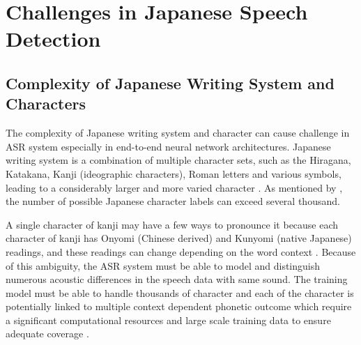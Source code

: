 \section{Challenges in Japanese Speech Detection}
\subsection{Complexity of Japanese Writing System and Characters}
The complexity of Japanese writing system and character can cause challenge in ASR system especially in end-to-end neural network architectures. Japanese writing system is a combination of multiple character sets, such as the Hiragana, Katakana, Kanji (ideographic characters), Roman letters and various symbols, leading to a considerably larger and more varied character \parencite{rose2019unique}. As mentioned by \textcite{Ito2016End-to-end,ito2017}, the number of possible Japanese character labels can exceed several thousand.

A single character of kanji may have a few ways to pronounce it because each character of kanji has Onyomi (Chinese derived) and Kunyomi (native Japanese) readings, and these readings can change depending on the word context \parencite{curtin2020japanese}. Because of this ambiguity, the ASR system must be able to model and distinguish numerous acoustic differences in the speech data with same sound. The training model must be able to handle thousands of character and each of the character is potentially linked to multiple context dependent phonetic outcome which require a significant computational resources and large scale training data to ensure adequate coverage \parencite{Ito2016End-to-end,ito2017}.




